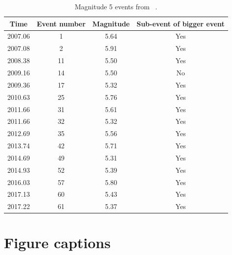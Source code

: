 \documentclass{article}
\begin{document}
 \begin{table}[hbt!]
 \caption{Magnitude 5 events from ~\citet{MIC_2019}.}
 \centering
 \begin{tabular}{c c c c}
 \hline
 Time & Event number & Magnitude & Sub-event of bigger event \\
 \hline
 2007.06 & 1 & 5.64 & Yes \\
 2007.08 & 2 & 5.91 & Yes \\
 2008.38 & 11 & 5.50 & Yes \\
 2009.16 & 14 & 5.50 & No \\
 2009.36 & 17 & 5.32 & Yes \\
 2010.63 & 25 & 5.76 & Yes \\
 2011.66 & 31 & 5.61 & Yes \\
 2011.66 & 32 & 5.32 & Yes \\
 2012.69 & 35 & 5.56 & Yes \\
 2013.74 & 42 & 5.71 & Yes \\
 2014.69 & 49 & 5.31 & Yes \\
 2014.93 & 52 & 5.39 & Yes \\
 2016.03 & 57 & 5.80 & Yes \\
 2017.13 & 60 & 5.43 & Yes \\
 2017.22 & 61 & 5.37 & Yes \\
 \hline
 \end{tabular}
 \end{table}

\newpage

\section*{Figure captions}
\end{document}
